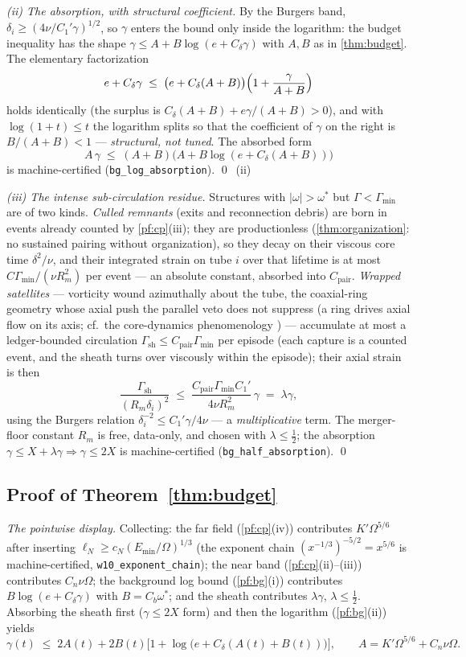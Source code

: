 \documentclass[11pt,letterpaper]{amsart}
\theoremstyle{definition}
\theoremstyle{remark}
\newcommand{\om}{\omega}
\newcommand{\abs}[1]{\lvert #1 \rvert}
\begin{document}
\emph{(ii) The absorption, with structural coefficient.} By the Burgers band,
$\delta_i\ge(4\nu/C_1'\gamma)^{1/2}$, so $\gamma$ enters the bound only inside the
logarithm: the budget inequality has the shape $\gamma\le A+B\log(e+C_\delta\gamma)$
with $A,B$ as in \cref{thm:budget}. The elementary factorization
\[
e+C_\delta\gamma\;\le\;\bigl(e+C_\delta(A+B)\bigr)\Bigl(1+\frac{\gamma}{A+B}\Bigr)
\]
holds identically (the surplus is $C_\delta(A+B)+e\gamma/(A+B)>0$), and with
$\log(1+t)\le t$ the logarithm splits so that the coefficient of $\gamma$ on the
right is $B/(A+B)<1$ --- \emph{structural, not tuned}. The absorbed form
\[
A\,\gamma\;\le\;(A+B)\bigl(A+B\log(e+C_\delta(A+B))\bigr)
\]
is machine-certified (\texttt{bg\_log\_absorption}). \qed\ (ii)

\emph{(iii) The intense sub-circulation residue.} Structures with
$\abs{\om}>\om^*$ but $\Gamma<\Gamma_{\min}$ are of two kinds. \emph{Culled remnants}
(exits and reconnection debris) are born in events already counted by
\cref{pf:cp}(iii); they are productionless (\cref{thm:organization}: no sustained
pairing without organization), so they decay on their viscous core time
$\delta^2/\nu$, and their integrated strain on tube $i$ over that lifetime is at most
$C\Gamma_{\min}/(\nu R_m^2)$ per event --- an absolute constant, absorbed into
$C_{\mathrm{pair}}$. \emph{Wrapped satellites} --- vorticity wound azimuthally about
the tube, the coaxial-ring geometry whose axial push the parallel veto does not
suppress (a ring drives axial flow on its axis; cf.\ the core-dynamics phenomenology
\cite{MelanderHussain1994}) --- accumulate at most a ledger-bounded circulation
$\Gamma_{\mathrm{sh}}\le C_{\mathrm{pair}}\Gamma_{\min}$ per episode (each capture is
a counted event, and the sheath turns over viscously within the episode); their
axial strain is then
\[
\frac{\Gamma_{\mathrm{sh}}}{(R_m\delta_i)^2}
\;\le\;\frac{C_{\mathrm{pair}}\Gamma_{\min}C_1'}{4\nu R_m^2}\,\gamma\;=\;\lambda\gamma,
\]
using the Burgers relation $\delta_i^{-2}\le C_1'\gamma/4\nu$ --- a
\emph{multiplicative} term. The merger-floor constant $R_m$ is free, data-only, and
chosen with $\lambda\le\tfrac12$; the absorption $\gamma\le X+\lambda\gamma\Rightarrow
\gamma\le2X$ is machine-certified (\texttt{bg\_half\_absorption}). \qed

\subsection{Proof of Theorem~\ref{thm:budget}}\label{pf:budget}
\emph{The pointwise display.} Collecting: the far field
(\cref{pf:cp}(iv)) contributes $K'\Omega^{5/6}$ after inserting
$\ell_N\ge c_N(E_{\min}/\Omega)^{1/3}$ (the exponent chain
$(x^{-1/3})^{-5/2}=x^{5/6}$ is machine-certified, \texttt{w10\_exponent\_chain});
the near band (\cref{pf:cp}(ii)--(iii)) contributes $C_n\nu\Omega$; the background
log bound (\cref{pf:bg}(i)) contributes $B\log(e+C_\delta\gamma)$ with $B=C_b\om^*$;
and the sheath contributes $\lambda\gamma$, $\lambda\le\tfrac12$. Absorbing the
sheath first ($\gamma\le2X$ form) and then the logarithm
(\cref{pf:bg}(ii)) yields
\[
\gamma(t)\;\le\;2A(t)+2B(t)\bigl[1+\log\bigl(e+C_\delta(A(t)+B(t))\bigr)\bigr],
\qquad A=K'\Omega^{5/6}+C_n\nu\Omega .
\]
\end{document}
